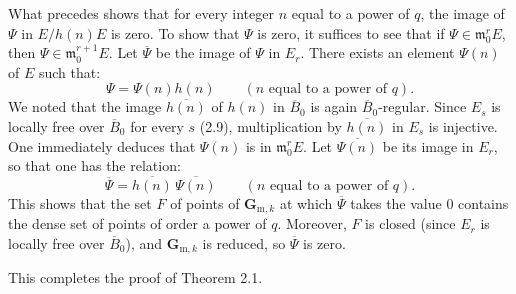 What precedes shows that for every integer $n$ equal to a power of $q$, the image of $\Psi$ in $E/h(n)E$ is zero. To show that $\Psi$ is zero, it suffices to see that if $\Psi\in\mathfrak m_0^rE$, then $\Psi\in\mathfrak m_0^{r+1}E$. Let $\overline\Psi$ be the image of $\Psi$ in $E_r$. There exists an element $\Psi(n)$ of $E$ such that:
\[
\Psi=\Psi(n)h(n)\qquad(n\text{ equal to a power of }q).
\]
We noted that the image $\overline{h(n)}$ of $h(n)$ in $\overline B_0$ is again $\overline B_0$-regular. Since $E_s$ is locally free over $\overline B_0$ for every $s$ (2.9), multiplication by $\overline{h(n)}$ in $E_s$ is injective. One immediately deduces that $\Psi(n)$ is in $\mathfrak m_0^rE$. Let $\overline{\Psi(n)}$ be its image in $E_r$, so that one has the relation:
\[
\overline\Psi=\overline{h(n)}\,\overline{\Psi(n)}\qquad(n\text{ equal to a power of }q).
\]
This shows that the set $F$ of points of $\mathbf G_{\mathrm m,k}$ at which $\overline\Psi$ takes the value $0$ contains the dense set of points of order a power of $q$. Moreover, $F$ is closed (since $E_r$ is locally free over $\overline B_0$), and $\mathbf G_{\mathrm m,k}$ is reduced, so $\overline\Psi$ is zero.

This completes the proof of Theorem 2.1.

